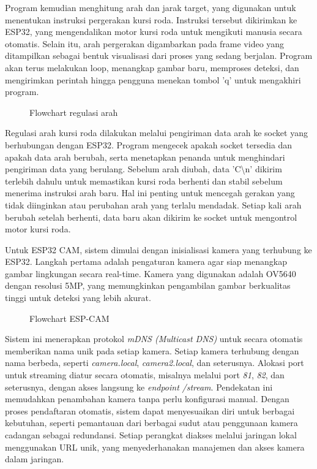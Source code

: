 Program kemudian menghitung arah dan jarak target, yang digunakan untuk menentukan instruksi pergerakan kursi roda. Instruksi tersebut dikirimkan ke ESP32, yang mengendalikan motor kursi roda untuk mengikuti manusia secara otomatis. Selain itu, arah pergerakan digambarkan pada frame video yang ditampilkan sebagai bentuk visualisasi dari proses yang sedang berjalan. Program akan terus melakukan loop, menangkap gambar baru, memproses deteksi, dan mengirimkan perintah hingga pengguna menekan tombol 'q' untuk mengakhiri program.


\begin{figure}[H]
  \centering
  \resizebox{0.5\linewidth}{!}{
    
  }
  \caption{Flowchart regulasi arah}
\end{figure}

Regulasi arah kursi roda dilakukan melalui pengiriman data arah ke socket yang berhubungan dengan ESP32. Program mengecek apakah socket tersedia dan apakah data arah berubah, serta menetapkan penanda untuk menghindari pengiriman data yang berulang. Sebelum arah diubah, data 'C\textbackslash n' dikirim terlebih dahulu untuk memastikan kursi roda berhenti dan stabil sebelum menerima instruksi arah baru. Hal ini penting untuk mencegah gerakan yang tidak diinginkan atau perubahan arah yang terlalu mendadak. Setiap kali arah berubah setelah berhenti, data baru akan dikirim ke socket untuk mengontrol motor kursi roda.

Untuk ESP32 CAM, sistem dimulai dengan inisialisasi kamera yang terhubung ke ESP32. Langkah pertama adalah pengaturan kamera agar siap menangkap gambar lingkungan secara real-time. Kamera yang digunakan adalah OV5640 dengan resolusi 5MP, yang memungkinkan pengambilan gambar berkualitas tinggi untuk deteksi yang lebih akurat.

\begin{figure}[H]
  \centering
  \resizebox{0.5\linewidth}{!}{
    
  }
  \caption{Flowchart ESP-CAM}
\end{figure}

Sistem ini menerapkan protokol \emph{mDNS (Multicast DNS)} untuk secara otomatis memberikan nama unik pada setiap kamera. Setiap kamera terhubung dengan nama berbeda, seperti \emph{camera.local}, \emph{camera2.local}, dan seterusnya. Alokasi port untuk streaming diatur secara otomatis, misalnya melalui port \emph{81}, \emph{82}, dan seterusnya, dengan akses langsung ke \emph{endpoint} \emph{/stream}. Pendekatan ini memudahkan penambahan kamera tanpa perlu konfigurasi manual. Dengan proses pendaftaran otomatis, sistem dapat menyesuaikan diri untuk berbagai kebutuhan, seperti pemantauan dari berbagai sudut atau penggunaan kamera cadangan sebagai redundansi. Setiap perangkat diakses melalui jaringan lokal menggunakan URL unik, yang menyederhanakan manajemen dan akses kamera dalam jaringan.

